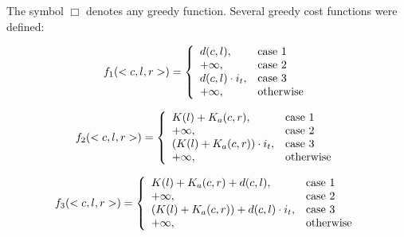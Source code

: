 \hfill

The symbol $\Box$ denotes any greedy function. Several greedy cost functions were defined:

\begin{equation}
f_1(<c, l, r>) =
    \left \{
    \begin{array}{l l}
        d(c, l),                   & \text{case 1} \\
        +\infty,                            & \text{case 2} \\
        d(c, l) \cdot i_t,  & \text{case 3} \\
        +\infty,                            & \text{otherwise}
    \end{array}
    \right.
\label{eq:greedy-cost-dist}
\end{equation}

\begin{equation}
f_2(<c, l, r>) =
    \left \{
    \begin{array}{l l}
        K(l) + K_a(c, r),                       & \text{case 1} \\
        +\infty,                                         & \text{case 2} \\
        (K(l) + K_a(c, r)) \cdot i_t,    & \text{case 3} \\
        +\infty,                                         & \text{otherwise}
    \end{array}
    \right.
\label{eq:greedy-cost-pop}
\end{equation}

\begin{equation}
f_3(<c, l, r>) =
    \left \{
    \begin{array}{l l}
        K(l) + K_a(c, r) + d(c, l),    & \text{case 1} \\
        +\infty,                                         & \text{case 2} \\
        (K(l) + K_a(c, r)) + d(c, l) \cdot i_t,
                                                         & \text{case 3} \\
        +\infty,                                         & \text{otherwise}
    \end{array}
    \right.
\label{eq:greedy-cost-dist-pop}
\end{equation}

